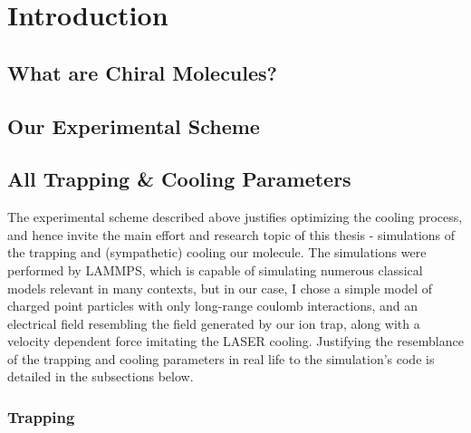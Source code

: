 \chapter{Introduction}



\section{What are Chiral Molecules?}

\section{Our Experimental Scheme}


\section{All Trapping \& Cooling Parameters}

The experimental scheme described above justifies optimizing the cooling process, and hence invite the main effort and research topic of this thesis - simulations of the trapping and (sympathetic) cooling our molecule. The simulations were performed by LAMMPS\cite{LAMMPS}, which is capable of simulating numerous classical models relevant in many contexts, but in our case, I chose a simple model of charged point particles with only long-range coulomb interactions, and an electrical field resembling the field generated by our ion trap, along with a velocity dependent force imitating the LASER cooling. Justifying the resemblance of the trapping and cooling parameters in real life to the simulation's code is detailed in the subsections below.

\subsection{Trapping}\label{ssec:params-trapping}

